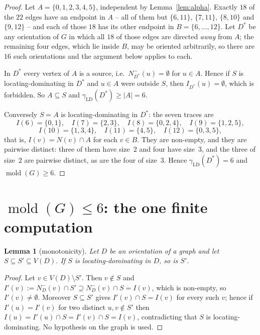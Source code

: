 \documentclass[11pt]{amsart}
\newtheorem{lemma}[theorem]{Lemma}
\theoremstyle{definition}
\theoremstyle{remark}
\DeclareMathOperator{\mold}{mold}
\newcommand{\gammaLD}{\gamma_{\mathrm{LD}}}
\newcommand{\Nin}{N^-}
\begin{document}
\begin{proof}
Let $A=\{0,1,2,3,4,5\}$, independent by Lemma~\ref{lem:alpha}. Exactly $18$ of
the $22$ edges have an endpoint in $A$ -- all of them but $\{6,11\}$,
$\{7,11\}$, $\{8,10\}$ and $\{9,12\}$ -- and each of those $18$ has its other endpoint in
$B=\{6,\dots,12\}$. Let $D^{*}$ be any orientation of $G$ in which all $18$ of
those edges are directed \emph{away} from $A$; the remaining four edges, which
lie inside $B$, may be oriented arbitrarily, so there are $16$ such
orientations and the argument below applies to each.

In $D^{*}$ every vertex of $A$ is a source, i.e.\ $\Nin_{D^{*}}(u)=\emptyset$
for $u\in A$. Hence if $S$ is locating-dominating in $D^{*}$ and $u\in A$ were
outside $S$, then $I_{D^{*}}(u)=\emptyset$, which is forbidden. So
$A\subseteq S$ and $\gammaLD(D^{*})\ge|A|=6$.

Conversely $S=A$ is locating-dominating in $D^{*}$: the seven traces are
\[
 I(6)=\{0,1\},\quad I(7)=\{2,3\},\quad I(8)=\{0,2,4\},\quad I(9)=\{1,2,5\},
\]
\[
 I(10)=\{1,3,4\},\quad I(11)=\{4,5\},\quad I(12)=\{0,3,5\},
\]
that is, $I(v)=N(v)\cap A$ for each $v\in B$. They are non-empty, and they are
pairwise distinct: three of them have size~$2$ and four have size~$3$, and the
three of size~$2$ are pairwise distinct, as are the four of size~$3$. Hence
$\gammaLD(D^{*})=6$ and $\mold(G)\ge6$.
\end{proof}

\section{$\mold(G)\le6$: the one finite computation}\label{sec:upper}

\begin{lemma}[monotonicity]\label{lem:mono}
Let $D$ be an orientation of a graph and let $S\subseteq S'\subseteq V(D)$. If
$S$ is locating-dominating in $D$, so is $S'$.
\end{lemma}

\begin{proof}
Let $v\in V(D)\setminus S'$. Then $v\notin S$ and
$I'(v):=\Nin_D(v)\cap S'\supseteq\Nin_D(v)\cap S=I(v)$, which is non-empty, so
$I'(v)\neq\emptyset$. Moreover $S\subseteq S'$ gives $I'(v)\cap S=I(v)$ for every
such $v$; hence if $I'(u)=I'(v)$ for two distinct $u,v\notin S'$ then
$I(u)=I'(u)\cap S=I'(v)\cap S=I(v)$, contradicting that $S$ is
locating-dominating. No hypothesis on the graph is used.
\end{proof}
\end{document}
